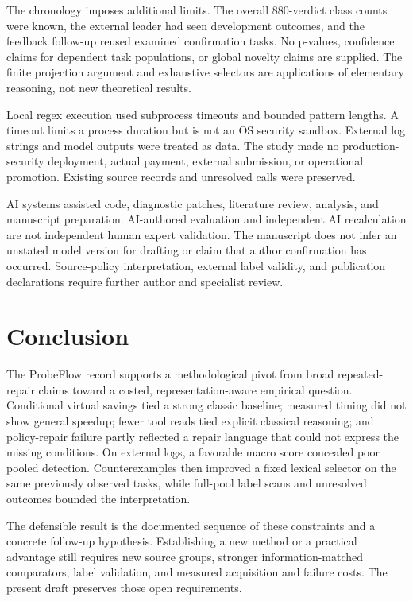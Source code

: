 \documentclass[10pt,twocolumn,letterpaper]{article}
\begin{document}
The chronology imposes additional limits. The overall 880-verdict class counts were known, the external leader had seen development outcomes, and the feedback follow-up reused examined confirmation tasks. No p-values, confidence claims for dependent task populations, or global novelty claims are supplied. The finite projection argument and exhaustive selectors are applications of elementary reasoning, not new theoretical results.

Local regex execution used subprocess timeouts and bounded pattern lengths. A timeout limits a process duration but is not an OS security sandbox. External log strings and model outputs were treated as data. The study made no production-security deployment, actual payment, external submission, or operational promotion. Existing source records and unresolved calls were preserved.

AI systems assisted code, diagnostic patches, literature review, analysis, and manuscript preparation. AI-authored evaluation and independent AI recalculation are not independent human expert validation. The manuscript does not infer an unstated model version for drafting or claim that author confirmation has occurred. Source-policy interpretation, external label validity, and publication declarations require further author and specialist review.

\section{Conclusion}
The ProbeFlow record supports a methodological pivot from broad repeated-repair claims toward a costed, representation-aware empirical question. Conditional virtual savings tied a strong classic baseline; measured timing did not show general speedup; fewer tool reads tied explicit classical reasoning; and policy-repair failure partly reflected a repair language that could not express the missing conditions. On external logs, a favorable macro score concealed poor pooled detection. Counterexamples then improved a fixed lexical selector on the same previously observed tasks, while full-pool label scans and unresolved outcomes bounded the interpretation.

The defensible result is the documented sequence of these constraints and a concrete follow-up hypothesis. Establishing a new method or a practical advantage still requires new source groups, stronger information-matched comparators, label validation, and measured acquisition and failure costs. The present draft preserves those open requirements.
\end{document}
